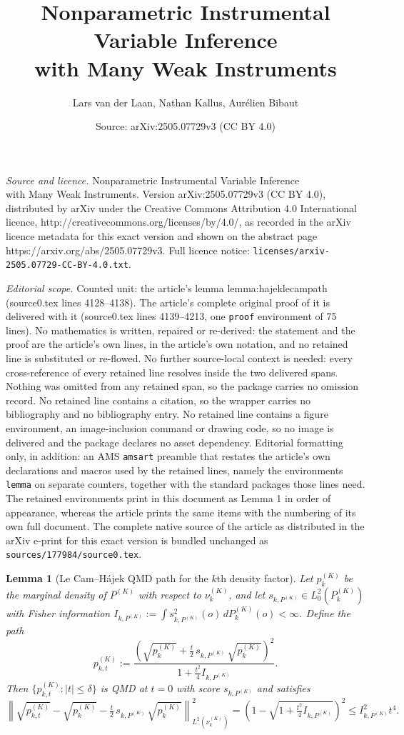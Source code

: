 \documentclass[10pt,a4paper]{amsart}
\title{Nonparametric Instrumental Variable Inference\\with Many Weak Instruments}
\author{Lars van der Laan, Nathan Kallus, Aur\'elien Bibaut}
\date{Source: arXiv:2505.07729v3 (CC BY 4.0)}
\newtheorem{lemma}{Lemma}
\begin{document}
\maketitle

\noindent\emph{Source and licence.} Nonparametric Instrumental Variable Inference\\with Many Weak Instruments. Version arXiv:2505.07729v3 (CC BY 4.0), distributed by arXiv under the Creative Commons Attribution 4.0 International licence, http://creativecommons.org/licenses/by/4.0/, as recorded in the arXiv licence metadata for this exact version and shown on the abstract page https://arxiv.org/abs/2505.07729v3. Full licence notice: \texttt{licenses/arxiv-2505.07729-CC-BY-4.0.txt}.\par\smallskip

\noindent\textit{Editorial scope.} Counted unit: the article's lemma lemma:hajeklecampath (source0.tex lines 4128--4138). The article's complete original proof of it is delivered with it (source0.tex lines 4139--4213, one \texttt{proof} environment of 75 lines). No mathematics is written, repaired or re-derived: the statement and the proof are the article's own lines, in the article's own notation, and no retained line is substituted or re-flowed.  No further source-local context is needed: every cross-reference of every retained line resolves inside the two delivered spans.  Nothing was omitted from any retained span, so the package carries no omission record.  No retained line contains a citation, so the wrapper carries no bibliography and no bibliography entry.  No retained line contains a figure environment, an image-inclusion command or drawing code, so no image is delivered and the package declares no asset dependency.  Editorial formatting only, in addition: an AMS \texttt{amsart} preamble that restates the article's own declarations and macros used by the retained lines, namely the environments \texttt{lemma} on separate counters, together with the standard packages those lines need.  The retained environments print in this document as Lemma 1 in order of appearance, whereas the article prints the same items with the numbering of its own full document.  The complete native source of the article as distributed in the arXiv e-print for this exact version is bundled unchanged as \texttt{sources/177984/source0.tex}.
\begin{lemma}[Le Cam--Hájek QMD path for the $k$th density factor]
Let $p_k^{(K)}$ be the marginal density of $P^{(K)}$ with respect to $\nu_k^{(K)}$, and let $s_{k,P^{(K)}} \in L_0^2(P_k^{(K)})$ with Fisher information $I_{k,P^{(K)}} := \int s_{k,P^{(K)}}^2(o)\,dP_k^{(K)}(o) < \infty$. Define the path
\[
p_{k,t}^{(K)} := \frac{\left( \sqrt{p_k^{(K)}} + \tfrac{t}{2}\,s_{k,P^{(K)}}\,\sqrt{p_k^{(K)}} \right)^2}{1 + \tfrac{t^2}{4}I_{k,P^{(K)}}}.
\]
Then $\{p_{k,t}^{(K)} : |t| \le \delta\}$ is QMD at $t = 0$ with score $s_{k,P^{(K)}}$ and satisfies
\[
\left\| \sqrt{p_{k,t}^{(K)}} - \sqrt{p_k^{(K)}} - \tfrac{t}{2}\,s_{k,P^{(K)}}\,\sqrt{p_k^{(K)}} \right\|_{L^2(\nu_k^{(K)})}^2
= \left( 1 - \sqrt{1 + \tfrac{t^2}{4}I_{k,P^{(K)}}} \right)^2 \leq I_{k,P^{(K)}}^2 t^4.
\] \label{lemma:hajeklecampath}
\end{lemma}
\end{document}

